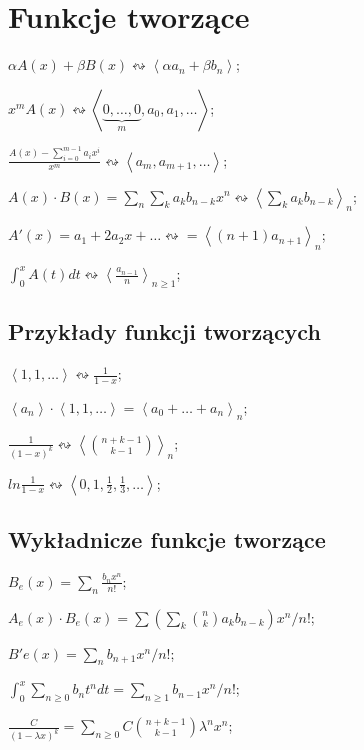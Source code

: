 \documentclass[10pt,a4paper,twocolumn]{article}
\newcommand{\angles}[1]{\left\langle #1 \right\rangle}
\begin{document}
\section{Funkcje tworzące}

$\alpha A(x) + \beta B(x) \leftrightsquigarrow \angles{\alpha a_n + \beta b_n}$;

$x^mA(x) \leftrightsquigarrow
  \angles{\underbrace{0, \dots, 0}_m, a_0, a_1, \dots}$;

$\frac{A(x) - \sum_{i=0}^{m-1}a_ix^i}{x^m} \leftrightsquigarrow
  \angles{a_m, a_{m+1}, \dots}$;

$A(x) \cdot B(x) =
  \sum_n \sum_k a_kb_{n-k}x^n \leftrightsquigarrow
  \angles{\sum_k a_k b_{n-k}}_n$;

$A'(x) = a_1 + 2a_2x + \dots \leftrightsquigarrow = \angles{(n+1)a_{n+1}}_n$;

$\int_0^xA(t)dt \leftrightsquigarrow \angles{\frac{a_{n-1}}{n}}_{n \geq 1}$;

\subsection{Przykłady funkcji tworzących}

$\angles{1,1,\dots} \leftrightsquigarrow \frac{1}{1-x}$;

$\angles{a_n} \cdot \angles{1,1,\dots} = \angles{a_0 + \dots + a_n}_n$;

$\frac{1}{(1-x)^k} \leftrightsquigarrow \angles{\binom{n + k -1}{k - 1}}_n$;

$ln \frac{1}{1-x} \leftrightsquigarrow
  \angles{0, 1, \frac{1}{2}, \frac{1}{3}, \dots}$;

\subsection{Wykładnicze funkcje tworzące}

$B_e(x) = \sum_n \frac{b_nx^n}{n!}$;

$A_e(x) \cdot B_e(x) =
  \sum \left ( \sum_k \binom{n}{k} a_k b_{n-k} \right ) x^n / n!$;

$B'e(x) = \sum_n b_{n+1} x^n/n!$;

$\int^x_0 \sum_{n \geq 0} b_nt^ndt = \sum_{n \geq 1} b_{n-1}x^n/n!$;

$\frac{C}{(1-\lambda x)^k} =
  \sum_{n\geq 0} C \binom{n + k - 1}{k - 1} \lambda^n x^n$;

\end{document}
